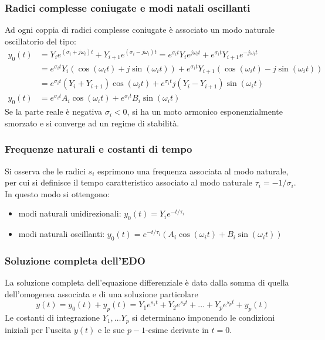\documentclass[a4paper]{article}
\begin{document}
\subsubsection*{Radici complesse coniugate e modi natali oscillanti}
Ad ogni coppia di radici complesse coniugate è associato un modo naturale oscillatorio del tipo:
\begin{align*}
	y_0(t) &= Y_i e^{(\sigma_i + j\omega_i)t} + Y_{i+1} e^{(\sigma_i - j\omega_i)t} = e^{\sigma_i t} Y_i e^{j\omega_i t} + e^{\sigma_i t} Y_{i+1} e^{-j\omega_i t} \\
	&= e^{\sigma_i t} Y_i (\cos (\omega_i t) + j\sin(\omega_i t)) + e^{\sigma_i t} Y_{i+1} (\cos (\omega_i t) - j\sin(\omega_i t)) \\
	&= e^{\sigma_i t} (Y_i + Y_{i+1}) \cos (\omega_i t) + e^{\sigma_i t} j (Y_i - Y_{i+1}) \sin(\omega_i t) \\
	y_0(t) &= e^{\sigma_i t} A_i \cos (\omega_i t) + e^{\sigma_i t} B_i \sin(\omega_i t)
\end{align*}
Se la parte reale è negativa \(\sigma_i < 0\), si ha un moto armonico esponenzialmente smorzato e si converge ad un regime di stabilità.

\subsubsection*{Frequenze naturali e costanti di tempo}
Si osserva che le radici \(s_i\) esprimono una frequenza associata al modo naturale, per cui si definisce il tempo caratteristico
associato al modo naturale \(\tau_i = -1/\sigma_i\). In questo modo si ottengono:
\begin{itemize}
	\item modi naturali unidirezionali: \(y_0(t) = Y_i e^{-t/\tau_i}\)
	\item modi naturali oscillanti: \(y_0(t) = e^{-t/\tau_i} (A_i \cos(\omega_i t) + B_i \sin(\omega_i t))\)
\end{itemize}

\subsubsection*{Soluzione completa dell'EDO}
La soluzione completa dell'equazione differenziale è data dalla somma di quella dell'omogenea associata e di una soluzione particolare
\[y(t) = y_0(t) + y_p(t) = Y_1e^{s_1t} + Y_2e^{s_2t} + ... + Y_pe^{s_pt} + y_p(t)\]
Le costanti di integrazione \(Y_1, \dots Y_p\) si determinano imponendo le condizioni iniziali per l'uscita \(y(t)\) e le sue
\(p-1\)-esime derivate in \(t = 0\).
\end{document}
